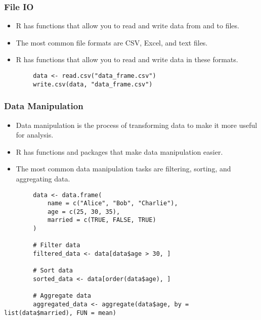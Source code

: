 \documentclass[serif, 9pt, aspectratio=32]{beamer}
\begin{document}
\begin{frame}
    \centering
    \frametitle{File IO}
    \begin{itemize}
        \setlength{\itemsep}{2em}
        \item R has functions that allow you to read and write data from and to files.
        \item The most common file formats are CSV, Excel, and text files.
        \item R has functions that allow you to read and write data in these formats.
    \end{itemize}
\end{frame}

\begin{frame}[fragile]
    \begin{lstlisting}
        data <- read.csv("data_frame.csv")
        write.csv(data, "data_frame.csv")
    \end{lstlisting}
\end{frame}

\begin{frame}
    \centering
    \frametitle{Data Manipulation}
    \begin{itemize}
        \setlength{\itemsep}{2em}
        \item Data manipulation is the process of transforming data to make it more useful for analysis.
        \item R has functions and packages that make data manipulation easier.
        \item The most common data manipulation tasks are filtering, sorting, and aggregating data.
    \end{itemize}
\end{frame}

\begin{frame}[fragile]
    \begin{lstlisting}
        data <- data.frame(
            name = c("Alice", "Bob", "Charlie"),
            age = c(25, 30, 35),
            married = c(TRUE, FALSE, TRUE)
        )

        # Filter data
        filtered_data <- data[data$age > 30, ]

        # Sort data
        sorted_data <- data[order(data$age), ]

        # Aggregate data
        aggregated_data <- aggregate(data$age, by = list(data$married), FUN = mean)
    \end{lstlisting}
\end{frame}
\end{document}
